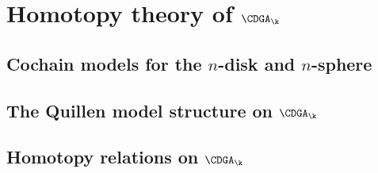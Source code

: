 
\newcommand{\titleCDGA}{\texorpdfstring{$\CDGA_\k$}{CDGA}}
\section{Homotopy theory of \titleCDGA}
\label{sec:model-of-cdga}

\subsection{Cochain models for the $n$-disk and $n$-sphere}


\subsection{The Quillen model structure on \titleCDGA}


\subsection{Homotopy relations on \titleCDGA}

